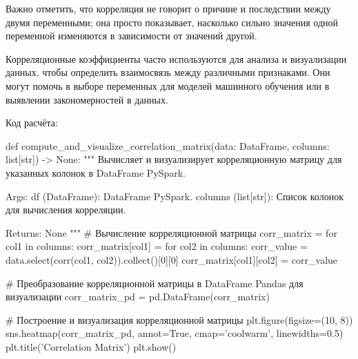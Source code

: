 Важно отметить, что корреляция не говорит о причине и последствии между двумя переменными; она просто показывает, насколько сильно значения одной переменной изменяются в зависимости от значений другой.

\par Корреляционные коэффициенты часто используются для анализа и визуализации данных, чтобы определить взаимосвязь между различными признаками. Они могут помочь в выборе переменных для моделей машинного обучения или в выявлении закономерностей в данных.

Код расчёта:
\begin{code}
def compute_and_visualize_correlation_matrix(data: DataFrame, 
                                             columns: list[str]) -> None:
    """
    Вычисляет и визуализирует корреляционную матрицу для указанных 
    колонок в DataFrame PySpark.

    Args:
        df (DataFrame): DataFrame PySpark.
        columns (list[str]): Список колонок для вычисления корреляции.

    Returns:
        None
    """
    # Вычисление корреляционной матрицы
    corr_matrix = {}
    for col1 in columns:
        corr_matrix[col1] = {}
        for col2 in columns:
            corr_value = data.select(corr(col1, col2)).collect()[0][0]
            corr_matrix[col1][col2] = corr_value

    # Преобразование корреляционной матрицы в DataFrame Pandas для визуализации
    corr_matrix_pd = pd.DataFrame(corr_matrix)

    # Построение и визуализация корреляционной матрицы
    plt.figure(figsize=(10, 8))
    sns.heatmap(corr_matrix_pd, annot=True, cmap='coolwarm', linewidths=0.5)
    plt.title('Correlation Matrix')
    plt.show()
\end{code}



